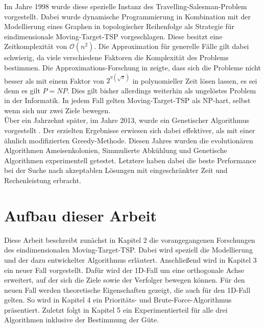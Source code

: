 \documentclass[german,version-2019-11]{uzl-thesis}
\begin{document}
Im Jahre 1998 wurde diese spezielle Instanz des Travelling-Salesman-Problem \\
vorgestellt\cite{helvig}. Dabei wurde dynamische Programmierung\cite{kunzi2013einfuhrungskursus} in Kombination mit der Modellierung eines Graphen in topologischer Reihenfolge als Strategie für eindimensionale Moving-Target-TSP vorgeschlagen. Diese besitzt eine Zeitkomplexität von $\mathcal{O}(n^2)$. Die Approximation für generelle Fälle gilt dabei schwierig, da viele verschiedene Faktoren die Komplexität des Problems bestimmen. Die Approximations-Forschung in \cite{hammar} zeigte, dass sich die Probleme nicht besser als mit einem Faktor von $2^{\pi(\sqrt{\pi})}$ in polynomieller Zeit lösen lassen, es sei denn es gilt $P=NP$. Dies gilt bisher allerdings weiterhin als ungelöstes Problem in der Informatik. In jedem Fall gelten Moving-Target-TSP als NP-hart, selbst wenn sich nur zwei Ziele bewegen\cite{hammar}.\\
Über ein Jahrzehnt später, im Jahre 2013, wurde ein Genetischer Algorithmus vorgestellt
\cite{choubey2013moving}. Der erzielten Ergebnisse erwiesen sich dabei effektiver, als mit einer ähnlich modifizierten Greedy-Methode. Diesen Jahres wurden die evolutionären Algorithmen\cite{weicker2015evolutionare} Ameisenkolonien, Simmulierte Abkühlung und Genetische Algorithmen experimentell getestet\cite{moraes}. Letztere haben dabei die beste Performance bei der Suche nach akzeptablen Lösungen mit eingeschränkter Zeit und Rechenleistung erbracht.

\section{Aufbau dieser Arbeit}
Diese Arbeit beschreibt zunächst in Kapitel 2 die vorangegangenen Forschungen des eindimensionalen Moving-Target-TSP. Dabei wird speziell die Modellierung und der dazu entwickelter Algorithmus erläutert. Anschließend wird in Kapitel 3 ein neuer Fall vorgestellt. Dafür wird der 1D-Fall um eine orthogonale Achse erweitert, auf der sich die Ziele sowie der Verfolger bewegen können. Für den neuen Fall werden theoretische Eigenschaften gezeigt, die auch für den 1D-Fall gelten. So wird in Kapitel 4 ein Prioritäts- und Brute-Force-Algorithmus präsentiert. Zuletzt folgt in Kapitel 5 ein Experimentierteil für alle drei Algorithmen inklusive der Bestimmung der Güte.
\end{document}
